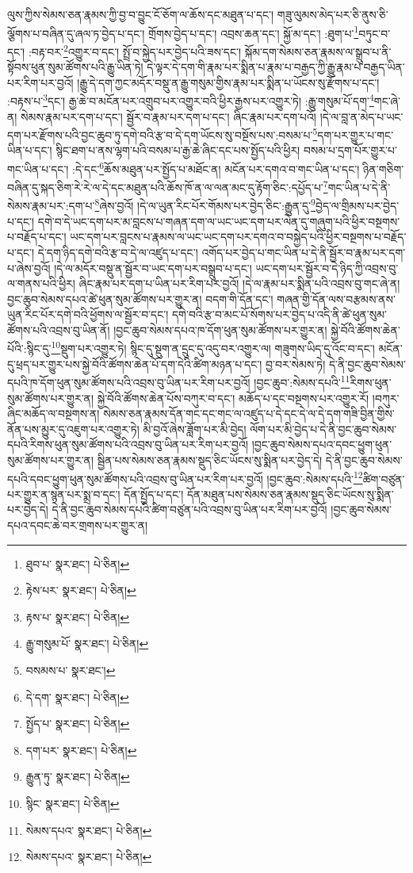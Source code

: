 ལུས་ཀྱིས་སེམས་ཅན་རྣམས་ཀྱི་བྱ་བ་བྱུང་ངོ་ཅོག་ལ་ཆོས་དང་མཐུན་པ་དང་། གཟུ་ལུམས་མེད་པར་ཅི་ནུས་ཅི་ལྕོགས་པ་བཞིན་དུ་ཞལ་ཏ་བྱེད་པ་དང་། གྲོགས་བྱེད་པ་དང་། འབྲས་ཆན་དང་། སྐྱོ་མ་དང་། :ཐུག་པ་\footnote{ཐུབ་པ་  སྣར་ཐང་།  པེ་ཅིན། }བཏུང་བ་དང་། :བརྟ་བར་\footnote{རྟེས་པར་  སྣར་ཐང་།  པེ་ཅིན། }འགྱུར་བ་དང་། སྤྲོ་བ་སྐྱེད་པར་བྱེད་པའི་ཟས་དང་། སྐོམ་དག་སེམས་ཅན་རྣམས་ལ་སྒྲུབ་པ་ནི་སྟོབས་ཕུན་སུམ་ཚོགས་པའི་རྒྱུ་ཡིན་ཏེ། དེ་ལྟར་དེ་དག་གི་རྣམ་པར་སྨིན་པ་རྣམ་པ་བརྒྱད་ཀྱི་རྒྱུ་རྣམ་པ་བརྒྱད་ཡིན་པར་རིག་པར་བྱའོ། །རྒྱུ་དེ་དག་ཀྱང་མདོར་བསྡུ་ན་རྒྱུ་གསུམ་གྱིས་རྣམ་པར་སྨིན་པ་ཡོངས་སུ་རྫོགས་པ་དང་། :བརྟས་པ་\footnote{རྟས་པ་  སྣར་ཐང་།  པེ་ཅིན། }དང་། རྒྱ་ཆེ་བ་མངོན་པར་འགྲུབ་པར་འགྱུར་བའི་ཕྱིར་རྒྱས་པར་འགྱུར་ཏེ། :རྒྱུ་གསུམ་པོ་དག་\footnote{རྒྱུ་གསུམ་པོ་  སྣར་ཐང་།  པེ་ཅིན། }གང་ཞེ་ན། སེམས་རྣམ་པར་དག་པ་དང་། སྦྱོར་བ་རྣམ་པར་དག་པ་དང་། ཞིང་རྣམ་པར་དག་པའོ། །དེ་ལ་བླ་ན་མེད་པ་ཡང་དག་པར་རྫོགས་པའི་བྱང་ཆུབ་ཏུ་དགེ་བའི་རྩ་བ་དེ་དག་ཡོངས་སུ་བསྔོས་པས་:བསམ་པ་\footnote{བསམས་པ་  སྣར་ཐང་། }དག་པར་གྱུར་པ་གང་ཡིན་པ་དང་། སྙིང་ཐག་པ་ནས་ལྷག་པའི་བསམ་པ་རྒྱ་ཆེ་ཞིང་དང་པས་སྤྱོད་པའི་ཕྱིར། བསམ་པ་དྲག་པོར་གྱུར་པ་གང་ཡིན་པ་དང་། :དེ་དང་\footnote{དེ་དག་  སྣར་ཐང་།  པེ་ཅིན། }ཆོས་མཐུན་པར་སྤྱོད་པ་མཐོང་ན། མངོན་པར་དགའ་བ་གང་ཡིན་པ་དང་། ཉིན་གཅིག་བཞིན་དུ་སྐད་ཅིག་རེ་རེ་ལ་དེ་དང་མཐུན་པའི་ཆོས་ཁོ་ན་ལ་ལན་མང་དུ་རྟོག་ཅིང་:དཔྱོད་པ་\footnote{སྤྱོད་པ་  སྣར་ཐང་།  པེ་ཅིན། }གང་ཡིན་པ་དེ་ནི་སེམས་རྣམ་པར་:དག་པ་\footnote{དག་པར་  སྣར་ཐང་།  པེ་ཅིན། }ཞེས་བྱའོ། །དེ་ལ་ཡུན་རིང་པོར་གོམས་པར་བྱེད་ཅིང་:རྒྱུན་དུ་\footnote{རྒྱུན་ཏུ་  སྣར་ཐང་།  པེ་ཅིན། }བྱེད་ལ་གྲིམས་པར་བྱེད་པ་དང་། དགེ་བ་དེ་ཡང་དག་པར་མ་བླངས་པ་གཞན་དག་ལ་ཡང་ཡང་དག་པར་ལེན་དུ་གཞུག་པའི་ཕྱིར་བསྔགས་པ་བརྗོད་པ་དང་། ཡང་དག་པར་བླངས་པ་རྣམས་ལ་ཡང་ཡང་དག་པར་དགའ་བ་བསྐྱེད་པའི་ཕྱིར་བསྔགས་པ་བརྗོད་པ་དང་། དེ་དག་ཉིད་དགེ་བའི་རྩ་བ་དེ་ལ་འཛུད་པ་དང་། འགོད་པར་བྱེད་པ་གང་ཡིན་པ་དེ་ནི་སྦྱོར་བ་རྣམ་པར་དག་པ་ཞེས་བྱའོ། །དེ་ལ་མདོར་བསྡུ་ན་སྦྱོར་བ་ཡང་དག་པར་བསྒྲུབ་པ་དང་། ཡང་དག་པར་སྦྱོར་བ་དེ་ཉིད་ཀྱི་འབྲས་བུ་ལ་གནས་པའི་ཕྱིར། ཞིང་རྣམ་པར་དག་པ་ཡིན་པར་རིག་པར་བྱའོ། །དེ་ལ་རྣམ་པར་སྨིན་པའི་འབྲས་བུ་གང་ཞེ་ན། བྱང་ཆུབ་སེམས་དཔའ་ཚེ་ཕུན་སུམ་ཚོགས་པར་གྱུར་ན། བདག་གི་དོན་དང་། གཞན་གྱི་དོན་ལས་བརྩམས་ནས་ཡུན་རིང་པོར་དགེ་བའི་ཕྱོགས་ལ་སྦྱོར་བ་དང་། དགེ་བའི་རྩ་བ་མང་པོ་སོགས་པར་བྱེད་པ་འདི་ནི་ཚེ་ཕུན་སུམ་ཚོགས་པའི་འབྲས་བུ་ཡིན་ནོ། །བྱང་ཆུབ་སེམས་དཔའ་ཁ་དོག་ཕུན་སུམ་ཚོགས་པར་གྱུར་ན། སྐྱེ་བོའི་ཚོགས་ཆེན་པོའི་:སྙིང་དུ་\footnote{སྙིང་  སྣར་ཐང་།  པེ་ཅིན། }སྡུག་པར་འགྱུར་ཏེ། སྙིང་དུ་སྡུག་ན་དྲུང་དུ་འདུ་བར་འགྱུར་ལ། གཟུགས་ཡིད་དུ་འོང་བ་དང་། མངོན་དུ་ཕྲད་པར་གྱུར་པས་སྐྱེ་བོའི་ཚོགས་ཆེན་པོ་དག་དེའི་ཚིག་མཉན་པ་དང་། བྱ་བར་སེམས་ཏེ། དེ་ནི་བྱང་ཆུབ་སེམས་དཔའི་ཁ་དོག་ཕུན་སུམ་ཚོགས་པའི་འབྲས་བུ་ཡིན་པར་རིག་པར་བྱའོ། །བྱང་ཆུབ་:སེམས་དཔའི་\footnote{སེམས་དཔའ་  སྣར་ཐང་།  པེ་ཅིན། }རིགས་ཕུན་སུམ་ཚོགས་པར་གྱུར་ན། སྐྱེ་བོའི་ཚོགས་ཆེན་པོས་བཀུར་བ་དང་། མཆོད་པ་དང་བསྔགས་པར་འགྱུར་རོ། །བཀུར་ཞིང་མཆོད་ལ་བསྔགས་ན། སེམས་ཅན་རྣམས་དོན་གང་དང་གང་ལ་འཛུད་པ་དེ་དང་དེ་ལ་དེ་དག་གཟི་བྱིན་གྱིས་ནོན་པས་མྱུར་དུ་འཇུག་པར་འགྱུར་ཏེ། མི་བྱའོ་ཞེས་ཟློག་པར་མི་བྱེད། ལོག་པར་མི་བྱེད་པ་དེ་ནི་བྱང་ཆུབ་སེམས་དཔའི་རིགས་ཕུན་སུམ་ཚོགས་པའི་འབྲས་བུ་ཡིན་པར་རིག་པར་བྱའོ། །བྱང་ཆུབ་སེམས་དཔའ་དབང་ཕྱུག་ཕུན་སུམ་ཚོགས་པར་གྱུར་ན། སྦྱིན་པས་སེམས་ཅན་རྣམས་སྡུད་ཅིང་ཡོངས་སུ་སྨིན་པར་བྱེད་དེ། དེ་ནི་བྱང་ཆུབ་སེམས་དཔའི་དབང་ཕྱུག་ཕུན་སུམ་ཚོགས་པའི་འབྲས་བུ་ཡིན་པར་རིག་པར་བྱའོ། །བྱང་ཆུབ་:སེམས་དཔའི་\footnote{སེམས་དཔའ་  སྣར་ཐང་།  པེ་ཅིན། }ཚིག་བཙུན་པར་གྱུར་ན་སྙན་པར་སྨྲ་བ་དང་། དོན་སྤྱོད་པ་དང་། དོན་མཐུན་པས་སེམས་ཅན་རྣམས་སྡུད་ཅིང་ཡོངས་སུ་སྨིན་པར་བྱེད་དེ། དེ་ནི་བྱང་ཆུབ་སེམས་དཔའི་ཚིག་བཙུན་པའི་འབྲས་བུ་ཡིན་པར་རིག་པར་བྱའོ། །བྱང་ཆུབ་སེམས་དཔའ་དབང་ཆེ་བར་གྲགས་པར་གྱུར་ན། 